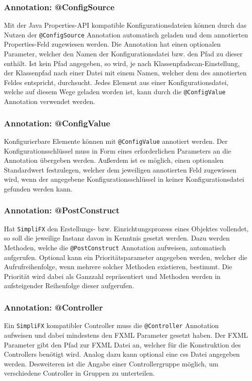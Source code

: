 \subsubsection{Annotation: @ConfigSource}
Mit der Java Properties-API kompatible Konfigurationsdateien können durch das Nutzen der \texttt{@ConfigSource} Annotation automatisch geladen und dem annotierten Properties-Feld zugewiesen werden. Die Annotation hat einen optionalen Parameter, welcher den Namen der Konfigurationsdatei bzw. den Pfad zu dieser enthält. Ist kein Pfad angegeben, so wird, je nach Klassenpfadscan-Einstellung, der Klassenpfad nach einer Datei mit einem Namen, welcher dem des annotierten Feldes entspricht, durchsucht. Jedes Element aus einer Konfigurationsdatei, welche auf diesem Wege geladen worden ist, kann durch die \texttt{@ConfigValue} Annotation verwendet werden.
\subsubsection{Annotation: @ConfigValue}
Konfigurierbare Elemente können mit \texttt{@ConfigValue} annotiert werden. Der Konfigurationsschlüssel muss in Form eines erforderlichen Parameters an die Annotation übergeben werden. Außerdem ist es möglich, einen optionalen Standardwert festzulegen, welcher dem jeweiligen annotierten Feld zugewiesen wird, wenn der angegebene Konfigurationsschlüssel in keiner Konfigurationsdatei gefunden werden kann.
\subsubsection{Annotation: @PostConstruct}
Hat \texttt{SimpliFX} den Erstellungs- bzw. Einrichtungsprozess eines Objektes vollendet, so soll die jeweilige Instanz davon in Kenntnis gesetzt werden. Dazu werden Methoden, welche die \texttt{@PostConstruct} Annotation aufweisen, automatisch aufgerufen. Optional kann ein Prioritätsparameter angegeben werden, welcher die Aufrufreihenfolge, wenn mehrere solcher Methoden existieren, bestimmt. Die Priorität wird dabei als Ganzzahl repräsentiert und Methoden werden in aufsteigender Reihenfolge dieser aufgerufen.
\subsubsection{Annotation: @Controller}
Ein \texttt{SimpliFX} kompatibler Controller muss die \texttt{@Controller} Annotation aufweisen und dabei mindestens den FXML Parameter gesetzt haben. Der FXML Parameter gibt den Pfad zur FXML Datei an, welcher für die Konstruktion des Controllers benötigt wird. Analog dazu kann optional eine \ac{css} Datei angegeben werden. Desweiteren ist die Angabe einer Controllergruppe möglich, um verschiedene Controller in Gruppen zu unterteilen.

